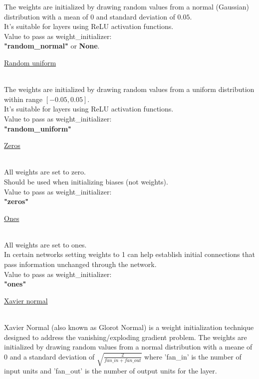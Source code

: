 \documentclass{article}
\begin{document}
The weights are initialized by drawing random values from a normal (Gaussian) distribution 
with a mean of $0$ and standard deviation of $0.05$. \\

It's suitable for layers using ReLU activation functions. \\

Value to pass as weight\_initializer: \\
\textbf{"random\_normal"} or \textbf{None}.
\pagebreak

\hypertarget{initialization_random_uniform}{\underline{Random uniform}} \\

The weights are initialized by drawing random values from a uniform distribution 
within range $[-0.05, 0.05]$. \\

It's suitable for layers using ReLU activation functions. \\

Value to pass as weight\_initializer: \\
\textbf{"random\_uniform"}
\pagebreak

\hypertarget{initialization_zeros}{\underline{Zeros}} \\

All weights are set to zero.\\

Should be used when initializing biases (not weights). \\

Value to pass as weight\_initializer: \\
\textbf{"zeros"}
\pagebreak

\hypertarget{initialization_ones}{\underline{Ones}} \\

All weights are set to ones.\\

In certain networks setting weights to 1 can help establish initial connections that 
pass information unchanged through the network. \\

Value to pass as weight\_initializer: \\
\textbf{"ones"}
\pagebreak
    
\hypertarget{initialization_xavier_normal}{\underline{Xavier normal}} \\

Xavier Normal (also known as Glorot Normal) is a weight initialization technique designed 
to address the vanishing/exploding gradient problem. The weights are initialized 
by drawing random values from a normal distribution with a meane of 0 and a standard deviation 
of $\sqrt{\frac{2}{fan\_in + fan\_out}}$ where 'fan\_in' is the number of input units and 'fan\_out'
is the number of output units for the layer. \\
\end{document}
